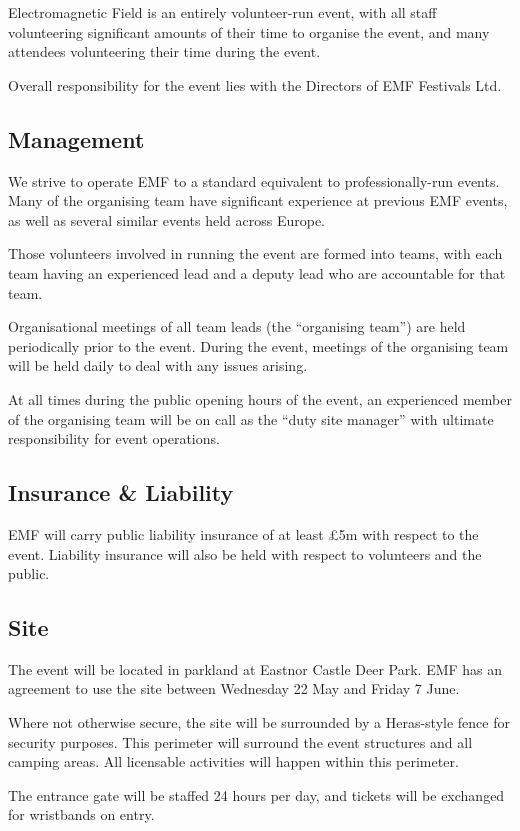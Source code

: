 Electromagnetic Field is an entirely volunteer-run event, with all staff
volunteering significant amounts of their time to organise the event, and many
attendees volunteering their time during the event.

Overall responsibility for the event lies with the Directors of EMF Festivals Ltd.

\subsection{Management}
We strive to operate EMF to a standard equivalent to professionally-run events.
Many of the organising team have significant experience at previous EMF events,
as well as several similar events held across Europe.

Those volunteers involved in running the event are formed into teams, with each
team having an experienced lead and a deputy lead who are accountable for that
team.

Organisational meetings of all team leads (the ``organising team'') are held
periodically prior to the event.  During the event, meetings of the organising
team will be held daily to deal with any issues arising.

At all times during the public opening hours of the event, an experienced member
of the organising team will be on call as the ``duty site manager'' with
ultimate responsibility for event operations.

\subsection{Insurance \& Liability}

EMF will carry public liability insurance of at least £5m with respect to the event.
Liability insurance will also be held with respect to volunteers and the public.

\subsection{Site}
The event will be located in parkland at Eastnor Castle Deer Park. EMF has
an agreement to use the site between Wednesday 22 May and Friday 7 June.

Where not otherwise secure, the site will be surrounded by a Heras-style fence
for security purposes.  This perimeter will surround the event structures and all
camping areas. All licensable activities will happen within this perimeter.

The entrance gate will be staffed 24 hours per day, and tickets will be
exchanged for wristbands on entry.

